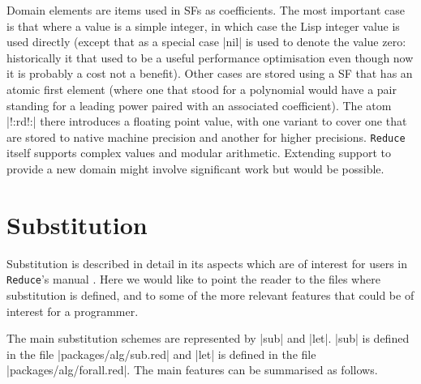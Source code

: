 \documentclass[12pt,twoside,openright]{memoir}
\newcommand{\reduce}{\texttt{Reduce}\xspace}
\begin{document}
\begin{itemize}
Domain elements are items used in SFs as coefficients. The most important case
is that where a value is a simple integer, in which case the Lisp integer value
is used directly (except that as a special case |nil| is used to denote
the value zero: historically it that used to be a useful performance
optimisation even though now it is probably a cost not a benefit). Other
cases are stored using a SF that has an atomic first element (where one
that stood for a polynomial would have a pair standing for a leading power
paired with an associated coefficient). The atom |!:rd!:| there introduces
a floating point value, with one variant to cover one that are stored to
native machine precision and another for higher precisions. \reduce itself
supports complex values and modular arithmetic. Extending support to provide
a new domain might involve significant work but would be possible.

\end{itemize}

\section{Substitution}

Substitution is described in detail in its aspects which are of interest for
users in \reduce's manual \cite{r38}. Here we would like to point the reader to
the files where substitution is defined, and to some of the more relevant
features that could be of interest for a programmer.

The main substitution schemes are represented by |sub| and |let|. |sub| is
defined in the file |packages/alg/sub.red| and |let| is defined in the file
|packages/alg/forall.red|. The main features can be summarised as follows.
\end{document}
